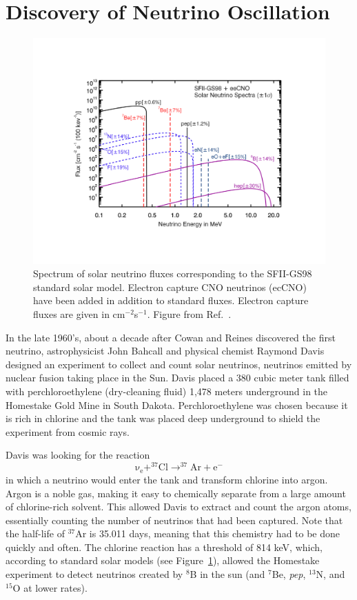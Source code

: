 \section{Discovery of Neutrino Oscillation} \label{sec:NeutrinoOsc}

\begin{figure}[h]
	\centering
	\includegraphics[width=0.7\linewidth]{tex/2-neutrinos-images/SolarFlux}
	\caption[Spectrum of solar neutrino fluxes]{Spectrum of solar neutrino fluxes corresponding to the SFII-GS98 standard solar model. Electron capture CNO neutrinos (ecCNO) have been added in addition to standard fluxes. Electron capture fluxes are given in cm$^{-2}$s$^{-1}$. Figure from Ref.~\cite{Serenelli:2016dgz}.}
	\label{fig:solarflux}
\end{figure}

In the late 1960's, about a decade after Cowan and Reines discovered the first neutrino, astrophysicist John Bahcall and physical chemist Raymond Davis designed an experiment to collect and count solar neutrinos, neutrinos emitted by nuclear fusion taking place in the Sun. 
Davis placed a 380 cubic meter tank filled with perchloroethylene (dry-cleaning fluid) 1,478 meters underground in the Homestake Gold Mine in South Dakota. 
Perchloroethylene was chosen because it is rich in chlorine and the tank was placed deep underground to shield the experiment from cosmic rays. 

Davis was looking for the reaction 
\begin{equation}
	\mathrm{\nu _{e}+ ^{37}Cl \rightarrow  ^{37}Ar+e^{-}} 
	\label{eq:ClAr}
\end{equation}
in which a neutrino would enter the tank and transform chlorine into argon. 
Argon is a noble gas, making it easy to chemically separate from a large amount of chlorine-rich solvent.
This allowed Davis to extract and count the argon atoms, essentially counting the number of neutrinos that had been captured.
Note that the half-life of $^{37}$Ar is 35.011 days, meaning that this chemistry had to be done quickly and often.
The chlorine reaction has a threshold of 814 keV, which, according to standard solar models (see Figure~\ref{fig:solarflux}), allowed the Homestake experiment to detect neutrinos created by $^8$B in the sun (and $^7$Be, \textit{pep}, $^{13}$N, and $^{15}$O at lower rates).

